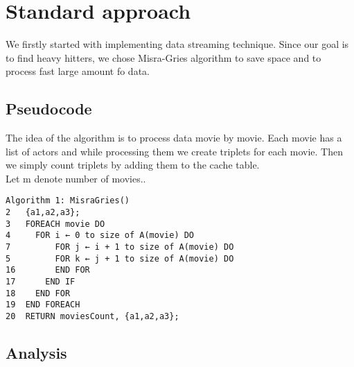 \label{Standard}
\section{Standard approach}

We firstly started with implementing data streaming technique. Since our goal is to find heavy hitters, we chose Misra-Gries algorithm to save space and to process fast large amount fo data.

\label{MisraGries}
\subsection{Pseudocode}
The idea of the algorithm is to process data movie by movie. Each movie has a list of actors and while processing them we create triplets for each movie. Then we simply count triplets by adding them to the cache table.
\\
Let m denote number of movies..

\begin{verbatim}
Algorithm 1: MisraGries()
2	{a1,a2,a3};
3	FOREACH movie DO
4	  FOR i ← 0 to size of A(movie) DO
7	      FOR j ← i + 1 to size of A(movie) DO
5		  FOR k ← j + 1 to size of A(movie) DO	          
16	      END FOR
17	    END IF
18	  END FOR
19	END FOREACH
20	RETURN moviesCount, {a1,a2,a3};	  	                    	  
\end{verbatim}

\label{AnalysisMisraGries}
\subsection{Analysis}
